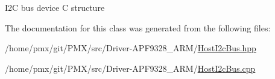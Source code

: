 I2C bus device C structure 

The documentation for this class was generated from the following files\+:\begin{DoxyCompactItemize}
\item 
/home/pmx/git/\+P\+M\+X/src/\+Driver-\/\+A\+P\+F9328\+\_\+\+A\+R\+M/\hyperlink{HostI2cBus_8hpp}{Host\+I2c\+Bus.\+hpp}\item 
/home/pmx/git/\+P\+M\+X/src/\+Driver-\/\+A\+P\+F9328\+\_\+\+A\+R\+M/\hyperlink{HostI2cBus_8cpp}{Host\+I2c\+Bus.\+cpp}\end{DoxyCompactItemize}
